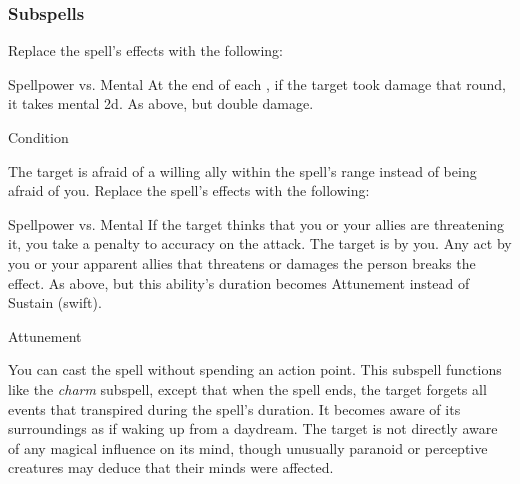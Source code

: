 \subsubsection{Subspells}
Replace the spell's effects with the following:
\begin{spellcontent}
\begin{augmenteffects}
\begin{spellattack}{Spellpower vs. Mental}
\spellsuccess At the end of each , if the target took damage that round, it takes mental  \minus2d.
\spellcritical As above, but double damage.
\end{spellattack}
\spelldur Condition
\end{augmenteffects}
\end{spellcontent}
The target is afraid of a willing ally within the spell's range instead of being afraid of you.
Replace the spell's effects with the following:
\begin{spellcontent}
\begin{augmenteffects}
\begin{spellattack}{Spellpower vs. Mental}
\spellspecial If the target thinks that you or your allies are threatening it, you take a  penalty to accuracy on the attack.
\spellsuccess
The target is \charmed by you.
Any act by you or your apparent allies that threatens or damages the  person breaks the effect.
\spellcritical As above, but this ability's duration becomes Attunement instead of Sustain (swift).
\end{spellattack}
\spelldur Attunement
\end{augmenteffects}
\end{spellcontent}
You can cast the spell without spending an action point.
This subspell functions like the \textit{charm} subspell, except that when the spell ends, the target forgets all events that transpired during the spell's duration.
It becomes aware of its surroundings as if waking up from a daydream.
The target is not directly aware of any magical influence on its mind, though unusually paranoid or perceptive creatures may deduce that their minds were affected.
